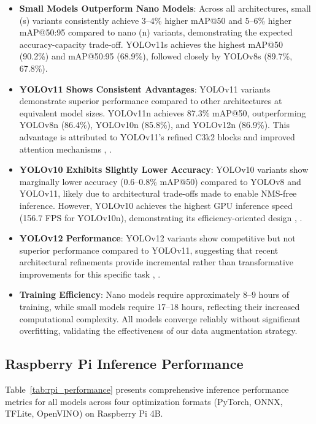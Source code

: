 \begin{itemize}
\item \textbf{Small Models Outperform Nano Models}: Across all architectures, small (s) variants consistently achieve 3--4\% higher mAP@50 and 5--6\% higher mAP@50:95 compared to nano (n) variants, demonstrating the expected accuracy-capacity trade-off. YOLOv11s achieves the highest mAP@50 (90.2\%) and mAP@50:95 (68.9\%), followed closely by YOLOv8s (89.7\%, 67.8\%).

\item \textbf{YOLOv11 Shows Consistent Advantages}: YOLOv11 variants demonstrate superior performance compared to other architectures at equivalent model sizes. YOLOv11n achieves 87.3\% mAP@50, outperforming YOLOv8n (86.4\%), YOLOv10n (85.8\%), and YOLOv12n (86.9\%). This advantage is attributed to YOLOv11's refined C3k2 blocks and improved attention mechanisms \cite{4}, \cite{25}.

\item \textbf{YOLOv10 Exhibits Slightly Lower Accuracy}: YOLOv10 variants show marginally lower accuracy (0.6--0.8\% mAP@50) compared to YOLOv8 and YOLOv11, likely due to architectural trade-offs made to enable NMS-free inference. However, YOLOv10 achieves the highest GPU inference speed (156.7 FPS for YOLOv10n), demonstrating its efficiency-oriented design \cite{21}, \cite{33}.

\item \textbf{YOLOv12 Performance}: YOLOv12 variants show competitive but not superior performance compared to YOLOv11, suggesting that recent architectural refinements provide incremental rather than transformative improvements for this specific task \cite{24}, \cite{31}.

\item \textbf{Training Efficiency}: Nano models require approximately 8--9 hours of training, while small models require 17--18 hours, reflecting their increased computational complexity. All models converge reliably without significant overfitting, validating the effectiveness of our data augmentation strategy.
\end{itemize}

\subsection{Raspberry Pi Inference Performance}

Table~\ref{tab:rpi_performance} presents comprehensive inference performance metrics for all models across four optimization formats (PyTorch, ONNX, TFLite, OpenVINO) on Raspberry Pi 4B.

